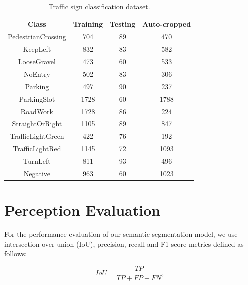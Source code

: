 \begin{table}[h]
  \begin{center}
    \caption{Traffic sign classification dataset.}
    \label{table:classification-dataset}
    \begin{tabular}{|c|c|c|c|}
      \hline
      \textbf{Class}     & \textbf{Training} & \textbf{Testing} & \textbf{Auto-cropped} \\
      \hline
      PedestrianCrossing & 704               & 89               & 470 \\
      \hline
      KeepLeft           & 832               & 83               & 582 \\
      \hline
      LooseGravel        & 473               & 60               & 533\\
      \hline
      NoEntry            & 502               & 83               & 306 \\
      \hline
      Parking            & 497               & 90               & 237 \\
      \hline
      ParkingSlot        & 1728              & 60               & 1788 \\
      \hline
      RoadWork           & 1728              & 86               & 224 \\
      \hline
      StraightOrRight    & 1105              & 89               & 847 \\
      \hline
      TrafficLightGreen  & 422               & 76               & 192 \\
      \hline
      TrafficLightRed    & 1145              & 72               & 1093 \\
      \hline
      TurnLeft           & 811               & 93               & 496 \\
      \hline
      Negative           & 963               & 60               & 1023 \\
      \hline
    \end{tabular}
  \end{center}
\end{table}

\section{Perception Evaluation}
For the performance evaluation of our semantic segmentation model, we use
intersection over union (IoU), precision, recall and F1-score metrics defined
as follows:

\begin{equation}
  IoU = \frac{TP}{TP + FP + FN},
  \label{eq:iou}
\end{equation}

